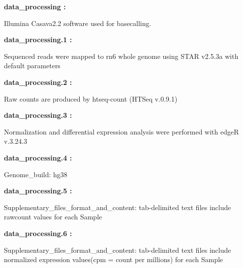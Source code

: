 \documentclass[
]{article}
\begin{document}
\begin{center}\begin{tcolorbox}[colback=gray!10, colframe=gray!50, width=0.9\linewidth, arc=1mm, boxrule=0.5pt]
\textbf{
data\_processing
:}

\vspace{0.5em}

    Illumina Casava2.2 software used for basecalling.

\vspace{2em}


\textbf{
data\_processing.1
:}

\vspace{0.5em}

    Sequenced reads were mapped to rn6 whole genome using
STAR v2.5.3a with default parameters

\vspace{2em}


\textbf{
data\_processing.2
:}

\vspace{0.5em}

    Raw counts are produced by htseq-count (HTSeq v.0.9.1)

\vspace{2em}


\textbf{
data\_processing.3
:}

\vspace{0.5em}

    Normalization and differential expression analysis were
performed with edgeR v.3.24.3

\vspace{2em}


\textbf{
data\_processing.4
:}

\vspace{0.5em}

    Genome\_build: hg38

\vspace{2em}


\textbf{
data\_processing.5
:}

\vspace{0.5em}

    Supplementary\_files\_format\_and\_content: tab-delimited
text files include rawcount values for each Sample

\vspace{2em}


\textbf{
data\_processing.6
:}

\vspace{0.5em}

    Supplementary\_files\_format\_and\_content: tab-delimited
text files include normalized expression values(cpm = count
per millions) for each Sample

\vspace{2em}
\end{tcolorbox}
\end{center}
\end{document}
